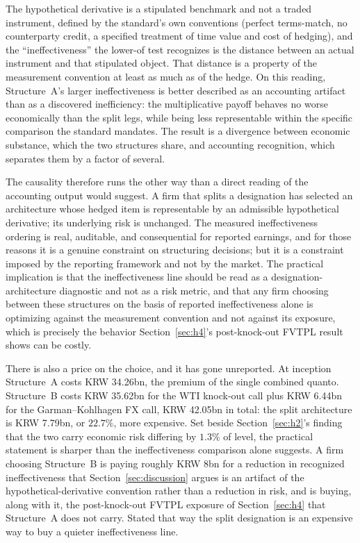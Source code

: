 \documentclass[11pt,a4paper]{article}
\begin{document}
The hypothetical derivative is a stipulated benchmark and not a traded instrument, defined by the standard's own conventions (perfect terms-match, no counterparty credit, a specified treatment of time value and cost of hedging), and the ``ineffectiveness'' the lower-of test recognizes is the distance between an actual instrument and that stipulated object. That distance is a property of the measurement convention at least as much as of the hedge. On this reading, Structure~A's larger ineffectiveness is better described as an accounting artifact than as a discovered inefficiency: the multiplicative payoff behaves no worse economically than the split legs, while being less representable within the specific comparison the standard mandates. The result is a divergence between economic substance, which the two structures share, and accounting recognition, which separates them by a factor of several.

The causality therefore runs the other way than a direct reading of the accounting output would suggest. A firm that splits a designation has selected an architecture whose hedged item is representable by an admissible hypothetical derivative; its underlying risk is unchanged. The measured ineffectiveness ordering is real, auditable, and consequential for reported earnings, and for those reasons it is a genuine constraint on structuring decisions; but it is a constraint imposed by the reporting framework and not by the market. The practical implication is that the ineffectiveness line should be read as a designation-architecture diagnostic and not as a risk metric, and that any firm choosing between these structures on the basis of reported ineffectiveness alone is optimizing against the measurement convention and not against its exposure, which is precisely the behavior Section~\ref{sec:h4}'s post-knock-out FVTPL result shows can be costly.

There is also a price on the choice, and it has gone unreported. At inception Structure~A costs KRW 34.26bn, the premium of the single combined quanto. Structure~B costs KRW 35.62bn for the WTI knock-out call plus KRW 6.44bn for the Garman--Kohlhagen FX call, KRW 42.05bn in total: the split architecture is KRW 7.79bn, or $22.7\%$, more expensive. Set beside Section~\ref{sec:h2}'s finding that the two carry economic risk differing by $1.3\%$ of level, the practical statement is sharper than the ineffectiveness comparison alone suggests. A firm choosing Structure~B is paying roughly KRW 8bn for a reduction in recognized ineffectiveness that Section~\ref{sec:discussion} argues is an artifact of the hypothetical-derivative convention rather than a reduction in risk, and is buying, along with it, the post-knock-out FVTPL exposure of Section~\ref{sec:h4} that Structure~A does not carry. Stated that way the split designation is an expensive way to buy a quieter ineffectiveness line.
\end{document}
